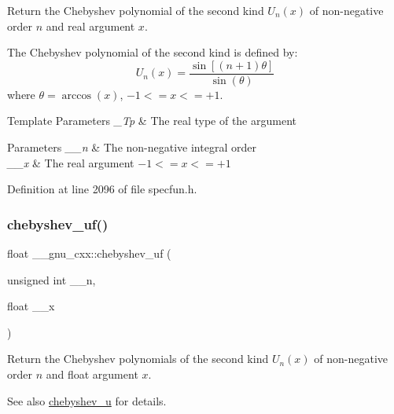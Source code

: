 Return the Chebyshev polynomial of the second kind $ U_n(x) $ of non-\/negative order $ n $ and real argument $ x $.

The Chebyshev polynomial of the second kind is defined by\+: \[ U_n(x) = \frac{\sin \left[(n+1)\theta \right]}{\sin(\theta)} \] where $ \theta = \arccos(x) $, $ -1 <= x <= +1 $.


\begin{DoxyTemplParams}{Template Parameters}
{\em \+\_\+\+Tp} & The real type of the argument \\
\hline
\end{DoxyTemplParams}

\begin{DoxyParams}{Parameters}
{\em \+\_\+\+\_\+n} & The non-\/negative integral order \\
\hline
{\em \+\_\+\+\_\+x} & The real argument $ -1 <= x <= +1 $ \\
\hline
\end{DoxyParams}


Definition at line 2096 of file specfun.\+h.

\mbox{\label{group__gnu__math__spec__func_ga4b28c2a079eae2e9612c9902801ca256}} 
\subsubsection{\texorpdfstring{chebyshev\+\_\+uf()}{chebyshev\_uf()}}
{\footnotesize\ttfamily float \+\_\+\+\_\+gnu\+\_\+cxx\+::chebyshev\+\_\+uf (\begin{DoxyParamCaption}\item[{unsigned int}]{\+\_\+\+\_\+n,  }\item[{float}]{\+\_\+\+\_\+x }\end{DoxyParamCaption})\hspace{0.3cm}{\ttfamily [inline]}}

Return the Chebyshev polynomials of the second kind $ U_n(x) $ of non-\/negative order $ n $ and {\ttfamily float} argument $ x $.

\begin{DoxySeeAlso}{See also}
\hyperlink{group__gnu__math__spec__func_gafa90c06bdedb8459f20576297cf1608f}{chebyshev\+\_\+u} for details. 
\end{DoxySeeAlso}


